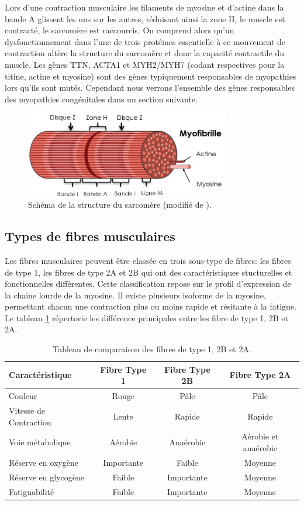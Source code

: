 Lors d'une contraction musculaire les filaments de myosine et d'actine dans la bande A glissent les uns sur les autres, réduisant ainsi la zone H, le muscle est contracté, le sarcomère est raccourcis. On comprend alors qu'un dysfonctionnement dans l'une de trois protéines essentielle à ce mouvement de contraction altère la structure du sarcomère et donc la capacité contractile du muscle. Les gènes TTN, ACTA1 et MYH2/MYH7 (codant respectives pour la titine, actine et myosine) sont des gènes typiquement responsables de myopathies lors qu'ils sont mutés. Cependant nous verrons l'ensemble des gènes responsables des myopathies congénitales dans un section suivante.
\begin{figure}[!ht]
 \centering
 \includegraphics[width=0.8\textwidth]{figures/sarcomere.png}
 \caption[Schéma de la structure du sarcomère.]{Schéma de la structure du sarcomère (modifié de \cite{burr_basic_2019}).}
 \label{fig:sarcomere}
\end{figure}

\subsection{Types de fibres musculaires}
Les fibres musculaires peuvent être classée en trois sous-type de fibres: les fibres de type 1, les fibres de type 2A et 2B qui ont des caractéristiques stucturelles et fonctionnelles différentes. Cette classification repose sur le profil d'expression de la chaine lourde de la myosine. Il existe plusieurs isoforme de la myosine, permettant chacun une contraction plus ou moins rapide et résitante à la fatigue. Le tableau \ref{table:fiber-compare} répertorie les différence principales entre les fibre de type 1, 2B et 2A.

\begin{table}[!ht]
\centering
\begin{tabular}{|l|c|c|c|} 
 \hline
 \textbf{Caractéristique} & \textbf{Fibre Type 1} & \textbf{Fibre Type 2B}  & \textbf{Fibre Type 2A} \\
 \hline
Couleur & Rouge & Pâle & Pâle \\
Vitesse de Contraction & Lente & Rapide & Rapide \\
Voie métabolique & Aérobie & Anaérobie & Aérobie et anaérobie \\
Réserve en oxygène & Importante & Faible & Moyenne \\
Réserve en glycogène & Faible & Importante & Moyenne \\
Fatiguabilité & Faible & Importante & Moyenne \\
 \hline
\end{tabular}
\caption{Tableau de comparaison des fibres de type 1, 2B et 2A.}
\label{table:fiber-compare}
\end{table}

